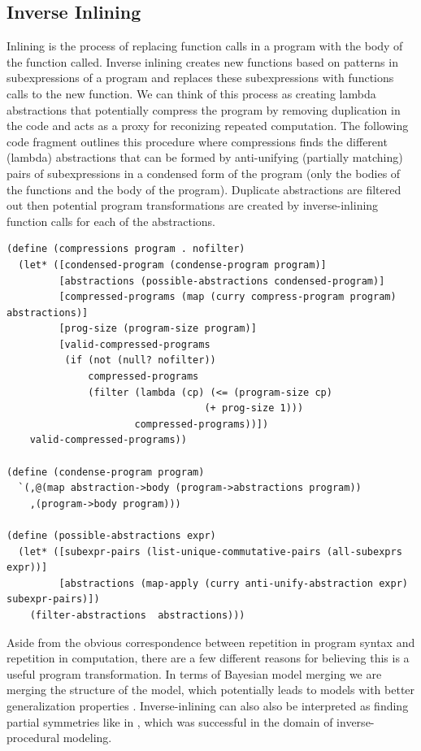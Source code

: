 \documentclass[a4paper,10pt]{article}
\begin{document}
\subsection{Inverse Inlining}
Inlining is the process of replacing function calls in a program with the body of the function called.  Inverse inlining creates new functions based on patterns in subexpressions of a program and replaces these subexpressions with functions calls to the new function.  We can think of this process as creating lambda abstractions that potentially compress the program by removing duplication in the code and acts as a proxy for reconizing repeated computation.  The following code fragment outlines this procedure where compressions finds the different (lambda) abstractions that can be formed by anti-unifying (partially matching) pairs of subexpressions in a condensed form of the program (only the bodies of the functions and the body of the program).  Duplicate abstractions are filtered out then potential program transformations are created by inverse-inlining function calls for each of the abstractions.  

\begin{lstlisting}[frame=trBL]
(define (compressions program . nofilter)
  (let* ([condensed-program (condense-program program)]
         [abstractions (possible-abstractions condensed-program)]
         [compressed-programs (map (curry compress-program program) abstractions)]
         [prog-size (program-size program)]
         [valid-compressed-programs
          (if (not (null? nofilter))
              compressed-programs
              (filter (lambda (cp) (<= (program-size cp)
                                  (+ prog-size 1)))
                      compressed-programs))])
    valid-compressed-programs))

(define (condense-program program)
  `(,@(map abstraction->body (program->abstractions program))
    ,(program->body program)))

(define (possible-abstractions expr)
  (let* ([subexpr-pairs (list-unique-commutative-pairs (all-subexprs expr))]
         [abstractions (map-apply (curry anti-unify-abstraction expr) subexpr-pairs)])
    (filter-abstractions  abstractions)))
\end{lstlisting}

Aside from the obvious correspondence between repetition in program syntax and repetition in computation, there are a few different reasons for believing this is a useful program transformation.  In terms of Bayesian model merging we are merging the structure of the model, which potentially leads to models with better generalization properties \cite{Stolcke:1994:IPG:645515.658235}.  Inverse-inlining can also also be interpreted as finding partial symmetries like in \cite{DBLP:journals/tog/BokelohWS10}, which was successful in the domain of inverse-procedural modeling.
\end{document}
